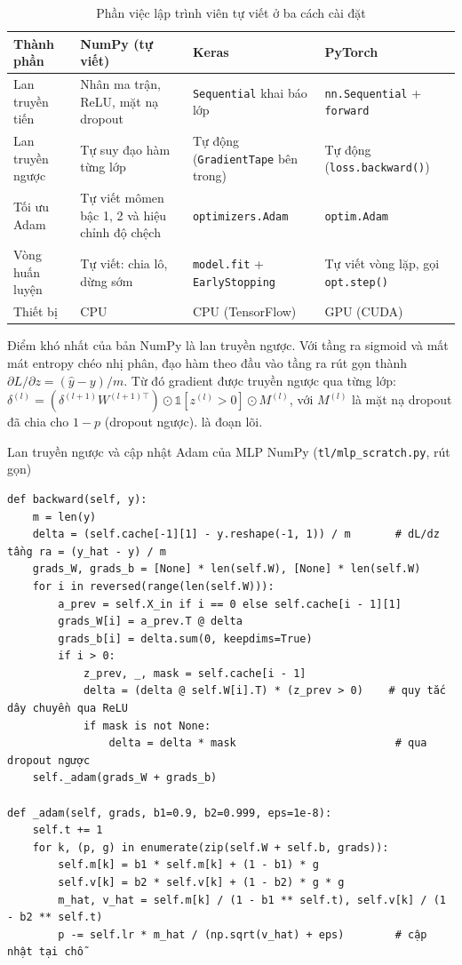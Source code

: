 \begin{table}[H]
\centering
\caption{Phần việc lập trình viên tự viết ở ba cách cài đặt}
\label{tab:ch2-three-code}
\small
\begin{tabularx}{\linewidth}{@{}L{3.0cm}YYY@{}}
\toprule
\textbf{Thành phần} & \textbf{NumPy (tự viết)} & \textbf{Keras} & \textbf{PyTorch} \\
\midrule
Lan truyền tiến & Nhân ma trận, ReLU, mặt nạ dropout & \texttt{Sequential} khai báo lớp & \texttt{nn.Sequential} + \texttt{forward} \\
Lan truyền ngược & Tự suy đạo hàm từng lớp & Tự động (\texttt{GradientTape} bên trong) & Tự động (\texttt{loss.backward()}) \\
Tối ưu Adam & Tự viết mômen bậc 1, 2 và hiệu chỉnh độ chệch & \texttt{optimizers.Adam} & \texttt{optim.Adam} \\
Vòng huấn luyện & Tự viết: chia lô, dừng sớm & \texttt{model.fit} + \texttt{EarlyStopping} & Tự viết vòng lặp, gọi \texttt{opt.step()} \\
Thiết bị & CPU & CPU (TensorFlow) & GPU (CUDA) \\
\bottomrule
\end{tabularx}
\end{table}

Điểm khó nhất của bản NumPy là lan truyền ngược. Với tầng ra sigmoid và mất mát entropy chéo nhị phân, đạo hàm theo đầu vào tầng ra rút gọn thành $\partial L/\partial z = (\hat y - y)/m$. Từ đó gradient được truyền ngược qua từng lớp: $\delta^{(l)} = (\delta^{(l+1)} W^{(l+1)\top}) \odot \mathbb{1}[z^{(l)}>0] \odot M^{(l)}$, với $M^{(l)}$ là mặt nạ dropout đã chia cho $1-p$ (dropout ngược).  là đoạn lõi.

\begin{code}{Lan truyền ngược và cập nhật Adam của MLP NumPy (\texttt{tl/mlp\_scratch.py}, rút gọn)}
\label{lst:ch2-numpy-backward}
\begin{verbatim}
def backward(self, y):
    m = len(y)
    delta = (self.cache[-1][1] - y.reshape(-1, 1)) / m       # dL/dz tầng ra = (y_hat - y) / m
    grads_W, grads_b = [None] * len(self.W), [None] * len(self.W)
    for i in reversed(range(len(self.W))):
        a_prev = self.X_in if i == 0 else self.cache[i - 1][1]
        grads_W[i] = a_prev.T @ delta
        grads_b[i] = delta.sum(0, keepdims=True)
        if i > 0:
            z_prev, _, mask = self.cache[i - 1]
            delta = (delta @ self.W[i].T) * (z_prev > 0)    # quy tắc dây chuyền qua ReLU
            if mask is not None:
                delta = delta * mask                         # qua dropout ngược
    self._adam(grads_W + grads_b)

def _adam(self, grads, b1=0.9, b2=0.999, eps=1e-8):
    self.t += 1
    for k, (p, g) in enumerate(zip(self.W + self.b, grads)):
        self.m[k] = b1 * self.m[k] + (1 - b1) * g
        self.v[k] = b2 * self.v[k] + (1 - b2) * g * g
        m_hat, v_hat = self.m[k] / (1 - b1 ** self.t), self.v[k] / (1 - b2 ** self.t)
        p -= self.lr * m_hat / (np.sqrt(v_hat) + eps)        # cập nhật tại chỗ
\end{verbatim}
\end{code}

